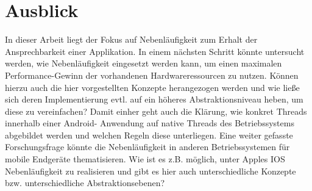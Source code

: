 \documentclass[12pt,oneside,a4paper,bibtotoc,liststotoc]{scrreprt}
\begin{document}
\section{Ausblick}
In dieser Arbeit liegt der Fokus auf Nebenläufigkeit zum Erhalt der Ansprechbarkeit einer Applikation. In einem nächsten Schritt könnte untersucht werden, wie Nebenläufigkeit eingesetzt werden kann, um einen maximalen Performance-Gewinn der vorhandenen Hardwareressourcen zu nutzen. Können hierzu auch die hier vorgestellten Konzepte herangezogen werden und wie ließe sich deren Implementierung evtl. auf ein höheres Abstraktionsniveau heben, um diese zu vereinfachen? Damit einher geht auch die Klärung, wie konkret Threads innerhalb einer Android- Anwendung auf native Threads des Betriebssystems abgebildet werden und welchen Regeln diese unterliegen. Eine weiter gefasste Forschungsfrage könnte die Nebenläufigkeit in anderen Betriebssystemen für mobile Endgeräte thematisieren. Wie ist es z.B. möglich, unter Apples IOS Nebenläufigkeit zu realisieren und gibt es hier auch unterschiedliche Konzepte bzw. unterschiedliche Abstraktionsebenen?

\nocite{javaConInPrac, nebenlaeufigeProg, handlerLooperBlock, android5, philosofen, handlerLooperBlock, androidDevDocu, declarativProgrammingScript, declarativCriticalJurnal, funcProgrJava, rxAllgDoku, heiseReactiveManifesto, reactiveManifesto, androidConcurrencyCriticalCompare, rxJavaCaseStudi, rxJavaTutorial, rxInitiative, futureToObservable, rxOnAndroidTips}
%


%

\newpage
\appendix
\end{document}
